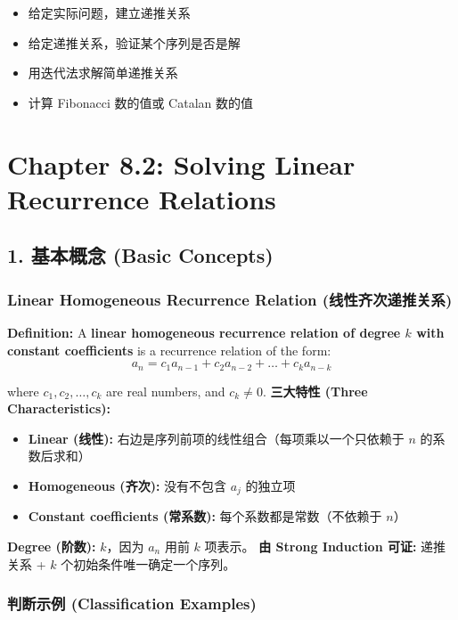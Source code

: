 \documentclass[10pt,a4paper,openany]{ctexbook}
\theoremstyle{definition}
\theoremstyle{remark}
\begin{document}
\begin{itemize}
\item 给定实际问题，建立递推关系
\item 给定递推关系，验证某个序列是否是解
\item 用迭代法求解简单递推关系
\item 计算 Fibonacci 数的值或 Catalan 数的值

\end{itemize}

\newpage

\section{Chapter 8.2: Solving Linear Recurrence Relations}

\subsection{1. 基本概念 (Basic Concepts)}

\subsubsection{Linear Homogeneous Recurrence Relation (线性齐次递推关系)}

\textbf{Definition:} A \textbf{linear homogeneous recurrence relation of degree $k$ with constant coefficients} is a recurrence relation of the form:
\[
a_n = c_1 a_{n-1} + c_2 a_{n-2} + \dots + c_k a_{n-k}
\]

where $c_1, c_2, \dots, c_k$ are real numbers, and $c_k \neq 0$.
\textbf{三大特性 (Three Characteristics):}
\begin{itemize}
\item \textbf{Linear (线性):} 右边是序列前项的线性组合（每项乘以一个只依赖于 $n$ 的系数后求和）
\item \textbf{Homogeneous (齐次):} 没有不包含 $a_j$ 的独立项
\item \textbf{Constant coefficients (常系数):} 每个系数都是常数（不依赖于 $n$）

\end{itemize}

\textbf{Degree (阶数):} $k$，因为 $a_n$ 用前 $k$ 项表示。
\textbf{由 Strong Induction 可证:} 递推关系 + $k$ 个初始条件唯一确定一个序列。
\subsubsection{判断示例 (Classification Examples)}
\end{document}
